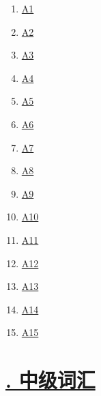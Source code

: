 \documentclass[11pt]{article}
\begin{document}
\begin{multicols}{5}
	\begin{enumerate}
		\item \href{https://mp.weixin.qq.com/s/VJDrAYnC1z_zjawdCWxBJw}{A1}	%
		\item \href{https://mp.weixin.qq.com/s/nEGXPZIPoAp7c7dmOlzv0Q}{A2}	%
		\item \href{https://mp.weixin.qq.com/s/LNZC3VfPbCxJoiCEsV7WGA}{A3}	%
		\item \href{https://mp.weixin.qq.com/s/c7K1SJ0XBU-S_kpv-oPOkg}{A4}	%
		\item \href{https://mp.weixin.qq.com/s/ZLcx_XDMZNpSHZaMe9fG8g}{A5}	%
		\item \href{https://mp.weixin.qq.com/s/Kg8-Zu7u7OE91_91tDnMOw}{A6}	%
		\item \href{https://mp.weixin.qq.com/s/oEraeqA4-M6uR_A2E4cWyQ}{A7}	%
		\item \href{https://mp.weixin.qq.com/s/Quzt3tL0ywpbUpaQ0Fk4KA}{A8}	%
		\item \href{https://mp.weixin.qq.com/s/PU5NbgotAIe_MS7_kXYXjg}{A9}	%
		\item \href{https://mp.weixin.qq.com/s/4915DVCYg0MldsLo4dsGXw}{A10}	%
		\item \href{https://mp.weixin.qq.com/s/1IVKqLjZh-bVL0BOqTAn3w}{A11}	%
		\item \href{https://mp.weixin.qq.com/s/uE8u2GDddiU-bbmODC1uvQ}{A12}	%
		\item \href{https://mp.weixin.qq.com/s/gJ90af6ZGS7-EWn7HcVnbg}{A13}	%
		\item \href{https://mp.weixin.qq.com/s/i0VCVzeYklqW1_C_XupwyQ}{A14}	%
		\item \href{https://mp.weixin.qq.com/s/7aV6UuaNoU1ZchqhK_NIZQ}{A15}	%
	\end{enumerate}
\end{multicols}



\vspace{-0.5cm}

\section*{\normalfont \large \href{https://www.youtube.com/watch?v=BdnMkCb9nOM&list=PL7aIrlqqP5K8_BmGCk4IFKeKP4ORS28a8}{. 中级词汇} }

\vspace{-0.5cm}
\end{document}

